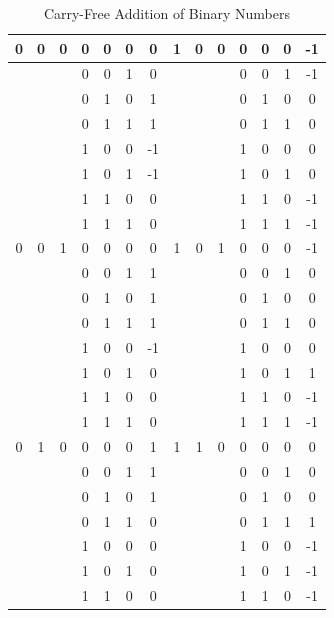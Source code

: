 \documentclass[conference]{IEEEtran_IBSS}
\begin{document}
\vspace{-.5em}
\begin{table}[h!]
  \centering
  \caption{Carry-Free Addition of Binary Numbers}
  \label{tab:table5}
  \begin{tabular}{|c|c|c|c|c|c||c|||c|c|c|c|c|c||c|}
    \hline
    0 & 0 & 0 & 0 & 0 & 0 & 0  &  1 & 0 & 0 & 0 & 0 & 0 & -1 \\
    \hline
    & & & 0 & 0 & 1 & 0  &  & & & 0 & 0 & 1 & -1 \\
    \hline
    & & & 0 & 1 & 0 & 1  &  & & & 0 & 1 & 0 & 0 \\
    \hline
    & & & 0 & 1 & 1 & 1  &  & & & 0 & 1 & 1 & 0 \\
    \hline
    & & & 1 & 0 & 0 & -1  &  & & & 1 & 0 & 0 & 0 \\
    \hline
    & & & 1 & 0 & 1 & -1  &  & & & 1 & 0 & 1 & 0 \\
    \hline
    & & & 1 & 1 & 0 & 0  &  & & & 1 & 1 & 0 & -1 \\
    \hline
    & & & 1 & 1 & 1 & 0  &  & & & 1 & 1 & 1 & -1 \\
    \hline
    0 & 0 & 1 & 0 & 0 & 0 & 0  &  1 & 0 & 1 & 0 & 0 & 0 & -1 \\
    \hline
    & & & 0 & 0 & 1 & 1  &  & & & 0 & 0 & 1 & 0 \\
    \hline
    & & & 0 & 1 & 0 & 1  &  & & & 0 & 1 & 0 & 0 \\
    \hline
    & & & 0 & 1 & 1 & 1  &  & & & 0 & 1 & 1 & 0 \\
    \hline
    & & & 1 & 0 & 0 & -1  &  & & & 1 & 0 & 0 & 0 \\
    \hline
    & & & 1 & 0 & 1 & 0  &  & & & 1 & 0 & 1 & 1 \\
    \hline
    & & & 1 & 1 & 0 & 0  &  & & & 1 & 1 & 0 & -1 \\
    \hline
    & & & 1 & 1 & 1 & 0  &  & & & 1 & 1 & 1 & -1 \\
    \hline
    0 & 1 & 0 & 0 & 0 & 0 & 1  &  1 & 1 & 0 & 0 & 0 & 0 & 0 \\
    \hline
    & & & 0 & 0 & 1 & 1  &  & & & 0 & 0 & 1 & 0 \\
    \hline
    & & & 0 & 1 & 0 & 1  &  & & & 0 & 1 & 0 & 0 \\
    \hline
    & & & 0 & 1 & 1 & 0  &  & & & 0 & 1 & 1 & 1 \\
    \hline
    & & & 1 & 0 & 0 & 0  &  & & & 1 & 0 & 0 & -1 \\
    \hline
    & & & 1 & 0 & 1 & 0  &  & & & 1 & 0 & 1 & -1 \\
    \hline
    & & & 1 & 1 & 0 & 0  &  & & & 1 & 1 & 0 & -1 \\

\end{tabular}
\end{table}
\end{document}
